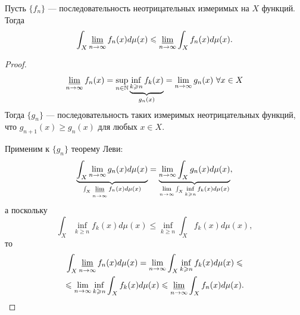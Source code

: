 \begin{lemma}[Фату]
    Пусть $\{f_n\}$ — последовательность неотрицательных измеримых на $X$ функций.
    Тогда
    \[\int_X \operatorname*{\underline{lim}}\limits_{n\to \infty} f_n(x) d\mu(x)
    \leqslant
    \operatorname*{\underline{lim}}\limits_{n\to \infty} \int_X f_n(x) d\mu(x).\]
\end{lemma} 
\begin{proof}
    \[\operatorname*{\underline{lim}}\limits_{n\to \infty} f_n(x) = \sup\limits_{n \in \mathbb{N}} \underbrace{\inf\limits_{k\geqslant n} f_k(x)}_{g_n(x)} = \lim\limits_{n\to \infty} g_n(x) \ \forall x \in X\]
    Тогда $\{g_n\}$ — последовательность таких измеримых неотрицательных функций, что $g_{n+1}(x) \geqslant g_n(x)$ для любых $x \in X$.
    
    Применим к $\{g_n\}$ теорему Леви:
    \[\underbrace{\int_X \lim\limits_{n\to \infty} g_n(x) d\mu(x)}_{\int_X \operatorname*{\underline{lim}}\limits_{n\to \infty} f_n(x) d\mu(x)} 
    =
    \underbrace{\lim\limits_{n\to \infty} \int_X g_n(x) d\mu(x)}_{\lim\limits_{n\to \infty} \int_X \inf\limits_{k \geqslant n} f_k(x) d\mu(x)},\]
    а поскольку
    \[\int_X \inf\limits_{k \geqslant n} f_k(x) d\mu(x) \leqslant \inf\limits_{k \geqslant n} \int_X f_k(x) d\mu(x),\]
    то
    \begin{multline*}
        \int_X \operatorname*{\underline{lim}}\limits_{n\to \infty} f_n(x) d\mu(x)
        =
        \lim\limits_{n\to \infty} \int_X \inf\limits_{k \geqslant n} f_k(x) d\mu(x)
        \leqslant\\\leqslant
        \lim\limits_{n\to \infty}\inf\limits_{k \geqslant n} \int_X f_k(x) d\mu(x)
        \leqslant
        \operatorname*{\underline{lim}}\limits_{n\to \infty} \int_X f_n(x) d\mu(x).
    \end{multline*} 
\end{proof} 



